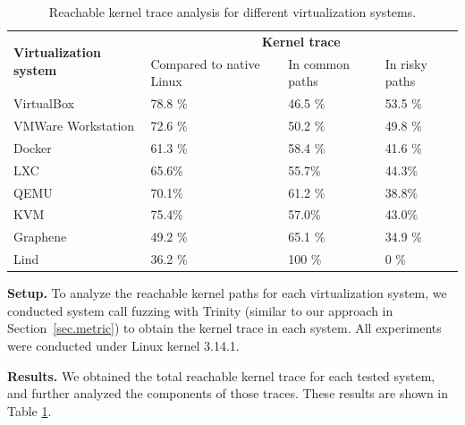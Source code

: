 {{{\begin{table}
\centering
\scriptsize
\caption{\small Reachable kernel trace analysis for different virtualization
systems.}
\begin{tabular}{|l|l|l|l|}
  \hline
  \multirow{3}{1.5cm}{\bf Virtualization system} & \multicolumn{3}{c|}{\bf Kernel trace} \\ \cline{2-4}
  & \multirow{2}{1.5cm}{Compared to native Linux} & \multirow{2}{1.5cm}{In common paths} & \multirow{2}{1cm}{In risky paths} \\
  & & & \\  \hline
  VirtualBox & 78.8 \% & 46.5 \% & 53.5 \% \\
  \hline
  \multirow{2}{1.5cm}{VMWare Workstation} & \multirow{2}{*}{72.6 \%} &
  \multirow{2}{*}{50.2 \%} & \multirow{2}{*}{49.8 \%} \\
  & & & \\   \hline
  Docker & 61.3 \% & 58.4 \% & 41.6 \% \\
  \hline
  LXC &  65.6\% &  55.7\% &  44.3\% \\
  \hline
   QEMU &  70.1\% & 61.2 \% &  38.8\% \\
  \hline
   KVM &  75.4\% &  57.0\% &  43.0\% \\
  \hline
  Graphene & 49.2 \% & 65.1 \% & 34.9 \% \\
  \hline
  Lind & 36.2 \% & 100 \% & 0 \% \\
  \hline
\end{tabular}
\label{table:trace-systems}
\end{table}

\textbf{Setup.}
To analyze the reachable kernel paths for each 
virtualization system,
we conducted system call fuzzing with Trinity (similar to our approach in Section~{\ref{sec.metric}}) to obtain
the kernel trace in each system. 
All experiments were conducted under Linux kernel 3.14.1.

\noindent
\textbf{Results.}
We obtained the total reachable kernel trace for
each tested system, %
and further analyzed the components of those traces. These results
are shown in Table \ref{table:trace-systems}.

}}}
